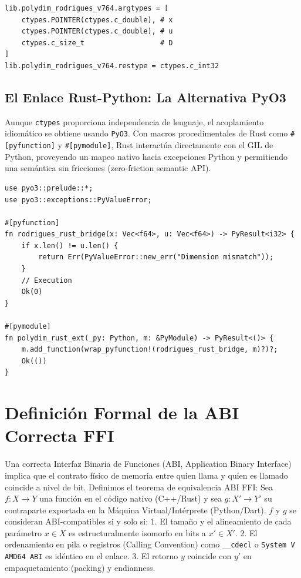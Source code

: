 \begin{verbatim}
lib.polydim_rodrigues_v764.argtypes = [
    ctypes.POINTER(ctypes.c_double), # x
    ctypes.POINTER(ctypes.c_double), # u
    ctypes.c_size_t                  # D
]
lib.polydim_rodrigues_v764.restype = ctypes.c_int32
\end{verbatim}

\subsection{El Enlace Rust-Python: La Alternativa PyO3}
Aunque \texttt{ctypes} proporciona independencia de lenguaje, el acoplamiento idiomático se obtiene usando \texttt{PyO3}. Con macros procedimentales de Rust como \texttt{\#[pyfunction]} y \texttt{\#[pymodule]}, Rust interactúa directamente con el GIL de Python, proveyendo un mapeo nativo hacia excepciones Python y permitiendo una semántica sin fricciones (zero-friction semantic API).

\begin{verbatim}
use pyo3::prelude::*;
use pyo3::exceptions::PyValueError;

#[pyfunction]
fn rodrigues_rust_bridge(x: Vec<f64>, u: Vec<f64>) -> PyResult<i32> {
    if x.len() != u.len() {
        return Err(PyValueError::new_err("Dimension mismatch"));
    }
    // Execution
    Ok(0)
}

#[pymodule]
fn polydim_rust_ext(_py: Python, m: &PyModule) -> PyResult<()> {
    m.add_function(wrap_pyfunction!(rodrigues_rust_bridge, m)?)?;
    Ok(())
}
\end{verbatim}

\section{Definición Formal de la ABI Correcta FFI}

Una correcta Interfaz Binaria de Funciones (ABI, Application Binary Interface) implica que el contrato físico de memoria entre quien llama y quien es llamado coincide a nivel de bit.
Definimos el teorema de equivalencia ABI FFI:
Sea $f: X \to Y$ una función en el código nativo (C++/Rust) y sea $g: X' \to Y'$ su contraparte exportada en la Máquina Virtual/Intérprete (Python/Dart). $f$ y $g$ se consideran ABI-compatibles si y solo si:
1. El tamaño y el alineamiento de cada parámetro $x \in X$ es estructuralmente isomorfo en bits a $x' \in X'$.
2. El ordenamiento en pila o registros (Calling Convention) como \texttt{\_\_cdecl} o \texttt{System V AMD64 ABI} es idéntico en el enlace.
3. El retorno $y$ coincide con $y'$ en empaquetamiento (packing) y endianness.

